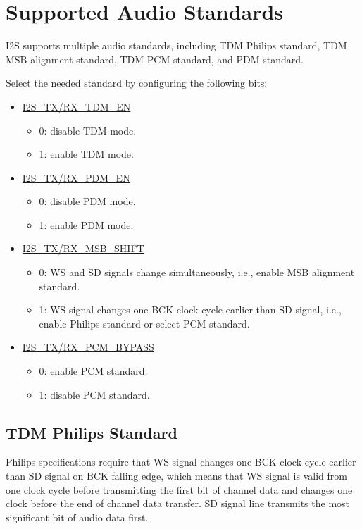 \documentclass[main\_\_EN.tex]{subfiles}
\begin{document}
\section{Supported Audio Standards} \label{sec:i2s-supported-audio-standards}


\chipname{} I2S supports multiple audio standards, including TDM Philips standard, TDM MSB alignment standard, TDM PCM standard, and PDM standard.

Select the needed standard by configuring the following bits:
\begin{itemize}
    \item \hyperref[fielddesc:I2SRXMSBSHIFT]{I2S\_TX/RX\_TDM\_EN}
    \begin{itemize}
        \item 0: disable TDM mode.
        \item 1: enable TDM mode.
    \end{itemize}
    \item \hyperref[fielddesc:I2SRXMSBSHIFT]{I2S\_TX/RX\_PDM\_EN}
    \begin{itemize}
        \item 0: disable PDM mode.
        \item 1: enable PDM mode.
    \end{itemize}    
    \item \hyperref[fielddesc:I2SRXMSBSHIFT]{I2S\_TX/RX\_MSB\_SHIFT}
    \begin{itemize}
        \item 0: WS and SD signals change simultaneously, i.e., enable MSB alignment standard.  
        \item 1: WS signal changes one BCK clock cycle earlier than SD signal, i.e., enable Philips standard or select PCM standard.
    \end{itemize}
    \item \hyperref[fielddesc:I2SRXPCMBYPASS]{I2S\_TX/RX\_PCM\_BYPASS}
    \begin{itemize}
        \item 0: enable PCM standard.
        \item 1: disable PCM standard.
    \end{itemize}
\end{itemize}

\subsection{TDM Philips Standard}


Philips specifications require that WS signal changes one BCK clock cycle earlier than SD signal on BCK falling edge, which means that WS signal is valid from one clock cycle before transmitting the first bit of channel data and changes one clock before the end of channel data transfer. SD signal line transmits the most significant bit of audio data first. 
\end{document}

